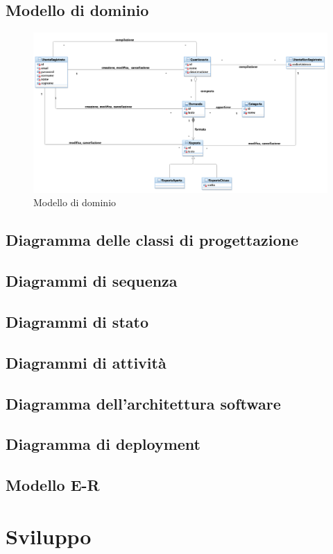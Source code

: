 \documentclass[12pt]{article}
\begin{document}
\subsection{Modello di dominio}
\begin{figure}[H]
\includegraphics[scale=0.5, left]{UNIMIBModule_UniMiBModuleDomainLayer.png}
\caption{Modello di dominio}
\end{figure}


\subsection{Diagramma delle classi di progettazione}
\subsection{Diagrammi di sequenza}
\subsection{Diagrammi di stato}
\subsection{Diagrammi di attivit\`{a}}
\subsection{Diagramma dell'architettura software}
\subsection{Diagramma di deployment}
\subsection{Modello E-R}
\section{Sviluppo}
\end{document}
